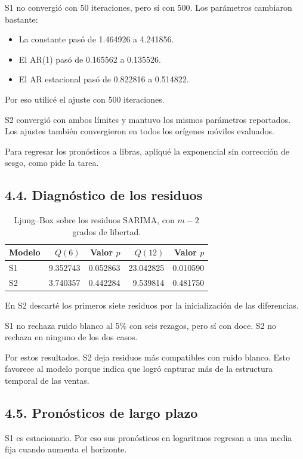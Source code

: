 \documentclass[11pt,letterpaper]{article}
\begin{document}
S1 no convergió con 50 iteraciones, pero sí con 500. Los parámetros cambiaron bastante:
\begin{itemize}
    \item La constante pasó de 1.464926 a 4.241856.
    \item El AR(1) pasó de 0.165562 a 0.135526.
    \item El AR estacional pasó de 0.822816 a 0.514822.
\end{itemize}

Por eso utilicé el ajuste con 500 iteraciones.

S2 convergió con ambos límites y mantuvo los mismos parámetros reportados. Los ajustes también convergieron en todos los orígenes móviles evaluados.

Para regresar los pronósticos a libras, apliqué la exponencial sin corrección de sesgo, como pide la tarea.

\subsection*{4.4. Diagnóstico de los residuos}

\begin{table}[H]
\centering
\caption{Ljung--Box sobre los residuos SARIMA, con $m-2$ grados de libertad.}
\begin{tabular}{lrrrr}
\toprule
Modelo & $Q(6)$ & Valor $p$ & $Q(12)$ & Valor $p$\\
\midrule
S1 & 9.352743 & 0.052863 & 23.042825 & 0.010590\\
S2 & 3.740357 & 0.442284 & 9.539814 & 0.481750\\
\bottomrule
\end{tabular}
\end{table}

En S2 descarté los primeros siete residuos por la inicialización de las diferencias.

S1 no rechaza ruido blanco al 5\% con seis rezagos, pero sí con doce. S2 no rechaza en ninguno de los dos casos.

Por estos resultados, S2 deja residuos más compatibles con ruido blanco. Esto favorece al modelo porque indica que logró capturar más de la estructura temporal de las ventas.

\subsection*{4.5. Pronósticos de largo plazo}

S1 es estacionario. Por eso sus pronósticos en logaritmos regresan a una media fija cuando aumenta el horizonte.
\end{document}

